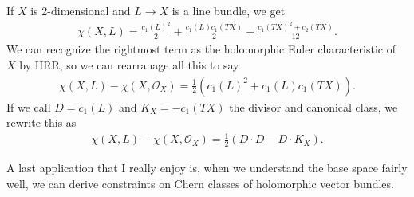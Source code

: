 \documentclass[11pt]{book}
\begin{document}
\begin{example} If $X$ is 2-dimensional and $L \to X$ is a line bundle, we get
\begin{align*}
    \chi(X,L) = \frac{c_1(L)^2}{2} + \frac{c_1(L)c_1(TX)}{2} + \frac{c_1(TX)^2 + c_2(TX)}{12}.
\end{align*}
We can recognize the rightmost term as the holomorphic Euler characteristic of $X$ by HRR, so we can rearranage all this to say
\begin{align*}
    \chi(X,L) - \chi(X,\mathcal{O}_X) = \frac{1}{2} \left( c_1(L)^2 + c_1(L) c_1(TX) \right).
\end{align*}
If we call $D = c_1(L)$ and $K_X = -c_1(TX)$ the divisor and canonical class, we rewrite this as
\begin{align*}
    \chi(X,L) - \chi(X,\mathcal{O}_X) = \frac{1}{2} \left( D\cdot D - D \cdot K_X \right).
\end{align*}
\end{example}

A last application that I really enjoy is, when we understand the base space fairly well, we can derive constraints on Chern classes of holomorphic vector bundles.
\end{document}
